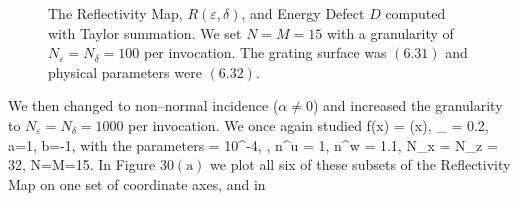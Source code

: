 %
\vspace{-21mm}
\begin{figure}[H]
    \centering
    \vspace{2mm}
    \caption{The Reflectivity Map, $R(\varepsilon,\delta)$, and Energy Defect $D$
    computed with Taylor summation. We set $N=M=15$ 
    with a granularity of $N_{\varepsilon}=N_{\delta}=100$ per invocation. The grating surface was $(6.31)$ and physical parameters were $(6.32)$.}
    \label{Fig:RM:Dielectric}
\end{figure}
\vspace{-18mm}
We then changed to non--normal incidence ($\alpha \neq 0$) and increased the granularity to $N_{\varepsilon}=N_{\delta}=1000$ per invocation. We once again studied
\be
f(x) = \cos(x),
\quad
\varepsilon_{} = 0.2,
\quad
a=1,
\quad
b=-1,
\ee
with the parameters
\be
\alpha = 10^{-4},
\quad
{},
\quad
n^u = 1,
\quad
n^w = 1.1,
\quad 
N_x = N_z = 32,
\quad
N=M=15.
\ee
In Figure $30(\text{a})$ we plot all six of these subsets of the 
Reflectivity Map on one set of coordinate axes, and in 
